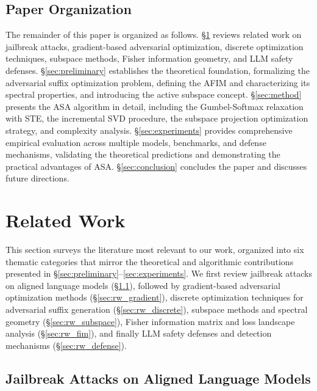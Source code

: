 ﻿\documentclass[lettersize,journal]{IEEEtran}
\begin{document}
\subsection{Paper Organization}
\label{sec:organization}

The remainder of this paper is organized as follows. \S\ref{sec:related_work} reviews related work on jailbreak attacks, gradient-based adversarial optimization, discrete optimization techniques, subspace methods, Fisher information geometry, and LLM safety defenses. \S\ref{sec:preliminary} establishes the theoretical foundation, formalizing the adversarial suffix optimization problem, defining the AFIM and characterizing its spectral properties, and introducing the active subspace concept. \S\ref{sec:method} presents the ASA algorithm in detail, including the Gumbel-Softmax relaxation with STE, the incremental SVD procedure, the subspace projection optimization strategy, and complexity analysis. \S\ref{sec:experiments} provides comprehensive empirical evaluation across multiple models, benchmarks, and defense mechanisms, validating the theoretical predictions and demonstrating the practical advantages of ASA. \S\ref{sec:conclusion} concludes the paper and discusses future directions.





\section{Related Work}
\label{sec:related_work}

This section surveys the literature most relevant to our work, organized into six thematic categories that mirror the theoretical and algorithmic contributions presented in \S\ref{sec:preliminary}--\ref{sec:experiments}. We first review jailbreak attacks on aligned language models (\S\ref{sec:rw_jailbreak}), followed by gradient-based adversarial optimization methods (\S\ref{sec:rw_gradient}), discrete optimization techniques for adversarial suffix generation (\S\ref{sec:rw_discrete}), subspace methods and spectral geometry (\S\ref{sec:rw_subspace}), Fisher information matrix and loss landscape analysis (\S\ref{sec:rw_fim}), and finally LLM safety defenses and detection mechanisms (\S\ref{sec:rw_defense}).

\subsection{Jailbreak Attacks on Aligned Language Models}
\label{sec:rw_jailbreak}
\end{document}
